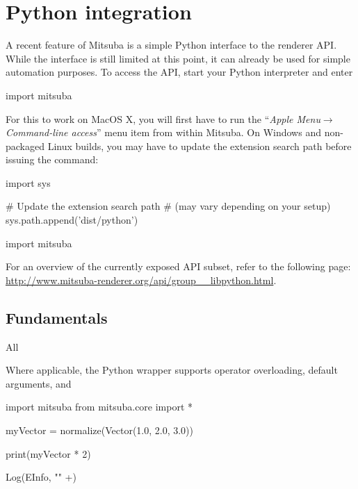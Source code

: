 \section{Python integration}
\label{sec:python}
A recent feature of Mitsuba is a simple Python interface to the renderer API. 
While the interface is still limited at this point, it can already be
used for simple automation purposes. To access the API, start your Python 
interpreter and enter
\begin{python}
import mitsuba
\end{python}
For this to work on MacOS X, you will first have to run the ``\emph{Apple
Menu}$\to$\emph{Command-line access}'' menu item from within Mitsuba.
On Windows and non-packaged Linux builds, you may have to update the extension
search path before issuing the  command:
\begin{python}
import sys

# Update the extension search path
# (may vary depending on your setup)
sys.path.append('dist/python')

import mitsuba
\end{python}
For an overview of the currently exposed API subset, refer
to the following page: \url{http://www.mitsuba-renderer.org/api/group__libpython.html}.

\subsection{Fundamentals}
All 

Where applicable, the Python wrapper supports operator overloading,
default arguments, and 
\begin{python}
import mitsuba
from mitsuba.core import *

myVector = normalize(Vector(1.0, 2.0, 3.0))

print(myVector * 2)

Log(EInfo, "" +)
\end{python}


